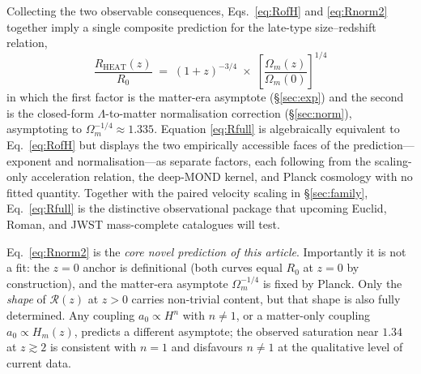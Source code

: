 \documentclass[twocolumn,letterpaper]{aastex631}
\newcommand{\azero}{a_0}
\newcommand{\heat}{\mathrm{HEAT}}
\begin{document}
Collecting the two observable consequences, Eqs.~\ref{eq:RofH} and
\ref{eq:Rnorm2} together imply a single composite prediction
for the late-type size--redshift relation,
\begin{equation}\label{eq:Rfull}
  \boxed{\;\;\frac{R_{\heat}(z)}{R_{0}}
   \;=\;(1+z)^{-3/4}\;\times\;
   \left[\frac{\Omega_{m}(z)}{\Omega_{m}(0)}\right]^{1/4}\;\;}
\end{equation}
in which the first factor is the matter-era asymptote
(\S\ref{sec:exp}) and the second is the closed-form
$\Lambda$-to-matter normalisation correction (\S\ref{sec:norm}),
asymptoting to $\Omega_{m}^{-1/4}\!\approx\!1.335$.  Equation
\ref{eq:Rfull} is algebraically equivalent to Eq.~\ref{eq:RofH}
but displays the two empirically accessible faces of the
prediction---exponent and normalisation---as separate factors,
each following from the scaling-only acceleration relation, the
deep-MOND kernel, and Planck cosmology with no fitted quantity.
Together with the paired velocity scaling in \S\ref{sec:family},
Eq.~\ref{eq:Rfull} is the distinctive observational package that
upcoming Euclid, Roman, and JWST mass-complete catalogues will
test.

Eq.~\ref{eq:Rnorm2} is the \emph{core novel prediction of this
article}.  Importantly it is not a fit: the $z=0$ anchor is definitional
(both curves equal $R_{0}$ at $z=0$ by construction), and the
matter-era asymptote $\Omega_{m}^{-1/4}$ is fixed by Planck.
Only the \emph{shape} of $\mathcal{R}(z)$ at $z>0$ carries
non-trivial content, but that shape is also fully determined.
Any coupling $\azero\propto H^{n}$ with $n\neq 1$, or a matter-only
coupling $\azero\propto H_{m}(z)$, predicts a different
asymptote; the observed saturation near $1.34$ at $z\gtrsim 2$
\citep[Table~\ref{tab:interz} below and][]{vanderWel2014} is
consistent with $n=1$ and disfavours $n\neq 1$ at the
qualitative level of current data.
\end{document}
